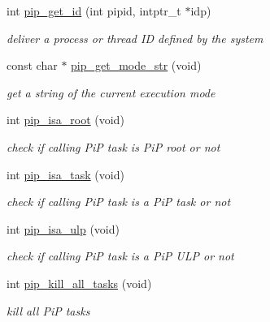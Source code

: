 \begin{DoxyCompactItemize}
\item 
int \hyperlink{group__libpip_ga8ed1ba448edbc0f2e0af78abdcc62b7c}{pip\-\_\-get\-\_\-id} (int pipid, intptr\-\_\-t $\ast$idp)
\begin{DoxyCompactList}\small\item\em deliver a process or thread I\-D defined by the system \end{DoxyCompactList}\end{DoxyCompactItemize}
\begin{DoxyCompactItemize}
\item 
const char $\ast$ \hyperlink{group__libpip_ga0e12c95fe7abc5c356acfd45a89ad5d8}{pip\-\_\-get\-\_\-mode\-\_\-str} (void)
\begin{DoxyCompactList}\small\item\em get a string of the current execution mode \end{DoxyCompactList}\end{DoxyCompactItemize}
\begin{DoxyCompactItemize}
\item 
int \hyperlink{group__libpip_ga6f1045bdbf682cb2ac504f09b57b73e9}{pip\-\_\-isa\-\_\-root} (void)
\begin{DoxyCompactList}\small\item\em check if calling Pi\-P task is Pi\-P root or not \end{DoxyCompactList}\end{DoxyCompactItemize}
\begin{DoxyCompactItemize}
\item 
int \hyperlink{group__libpip_gaf0283e47ad2d415206d6a3fa61e8a0a9}{pip\-\_\-isa\-\_\-task} (void)
\begin{DoxyCompactList}\small\item\em check if calling Pi\-P task is a Pi\-P task or not \end{DoxyCompactList}\end{DoxyCompactItemize}
\begin{DoxyCompactItemize}
\item 
int \hyperlink{group__libpip_gafc11d79f0f63c4c57ccb5c3bb2803241}{pip\-\_\-isa\-\_\-ulp} (void)
\begin{DoxyCompactList}\small\item\em check if calling Pi\-P task is a Pi\-P U\-L\-P or not \end{DoxyCompactList}\end{DoxyCompactItemize}
\begin{DoxyCompactItemize}
\item 
int \hyperlink{group__libpip_gab7ba5cc62101240c68acf07905e36772}{pip\-\_\-kill\-\_\-all\-\_\-tasks} (void)
\begin{DoxyCompactList}\small\item\em kill all Pi\-P tasks \end{DoxyCompactList}\end{DoxyCompactItemize}
